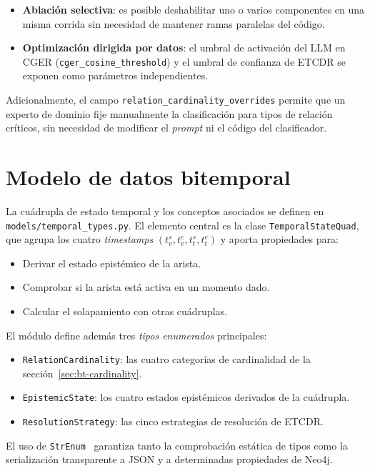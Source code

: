\begin{itemize}
  \item \textbf{Ablación selectiva}: es posible deshabilitar uno o varios componentes en una misma corrida sin necesidad de mantener ramas paralelas del código.
  \item \textbf{Optimización dirigida por datos}: el umbral de activación del LLM en CGER (\texttt{cger\_cosine\_threshold}) y el umbral de confianza de ETCDR se exponen como parámetros independientes.
\end{itemize}

Adicionalmente, el campo \texttt{relation\_cardinality\_overrides} permite que un experto de dominio fije manualmente la clasificación para tipos de relación críticos, sin necesidad de modificar el \emph{prompt} ni el código del clasificador.

\section{Modelo de datos bitemporal}\label{sec:impl-data-model}

La cuádrupla de estado temporal y los conceptos asociados se definen en \texttt{models/temporal\_types.py}. El elemento central es la clase \texttt{TemporalStateQuad}, que agrupa los cuatro \emph{timestamps} $(t_v^s, t_v^e, t_t^s, t_t^e)$ y aporta propiedades para:

\begin{itemize}
  \item Derivar el estado epistémico de la arista.
  \item Comprobar si la arista está activa en un momento dado.
  \item Calcular el solapamiento con otras cuádruplas.
\end{itemize}

El módulo define además tres \emph{tipos enumerados} principales:

\begin{itemize}
  \item \texttt{RelationCardinality}: las cuatro categorías de cardinalidad de la sección~\ref{sec:bt-cardinality}.
  \item \texttt{EpistemicState}: los cuatro estados epistémicos derivados de la cuádrupla.
  \item \texttt{ResolutionStrategy}: las cinco estrategias de resolución de ETCDR.
\end{itemize}

El uso de \texttt{StrEnum}~\cite{TODO_strenum} garantiza tanto la comprobación estática de tipos como la serialización transparente a JSON y a determinadas propiedades de Neo4j.


